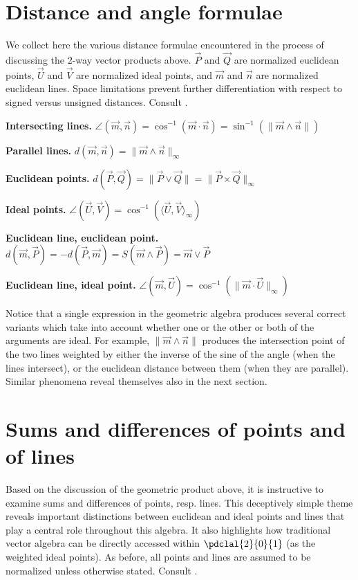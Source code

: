 \documentclass[12pt]{article}
\begin{document}
\section{Distance and angle formulae}
\label{sec:daf}
We collect here the various distance formulae  encountered in the process of discussing the 2-way vector products above.  $\vec{P}$ and $\vec{Q}$ are normalized euclidean points, $\vec{U}$ and $\vec{V}$ are normalized ideal points, and $\vec{m}$ and $\vec{n}$ are normalized euclidean lines.  Space limitations prevent further differentiation with respect to signed versus unsigned distances. Consult .
\begin{compactenum}
\item \textbf{Intersecting lines.} $\angle(\vec{m},\vec{n}) = \cos^{-1}{(\vec{m} \cdot \vec{n})} = \sin^{-1}{(\| \vec{m} \wedge \vec{n} \|)}$
\item \textbf{Parallel lines.} $d(\vec{m}, \vec{n}) = \|\vec{m} \wedge \vec{n}\|_\infty$
\item \textbf{Euclidean points.} $d(\vec{P},\vec{Q}) = \|\vec{P} \vee \vec{Q} \| = \| \vec{P} \times \vec{Q} \|_\infty$
\item \textbf{Ideal points.} $\angle(\vec{U}, \vec{V}) = \cos^{-1}(\langle \vec{U}, \vec{V} \rangle_{\infty})$
\item \textbf{Euclidean line, euclidean point.} $d(\vec{m}, \vec{P})  = -d(\vec{P}, \vec{m}) = S(\vec{m} \wedge \vec{P}) = \vec{m} \vee \vec{P} $
\item \textbf{Euclidean line, ideal point.} $\angle(\vec{m}, \vec{U}) = \cos^{-1}{(\| \vec{m} \cdot \vec{U} \|_{\infty})}$
\end{compactenum}
Notice that  a single expression in the geometric algebra produces several correct variants which take into account whether one or the other or both of the arguments are ideal.  For example, $ \|\vec{m} \wedge \vec{n}\|$ produces the intersection point of the two lines weighted by either the inverse of the sine of the angle (when the lines intersect), or the euclidean distance between them (when they are parallel).  Similar phenomena reveal themselves also in the next section.
\vspace{-.1in}
 
 \section{Sums and differences of points and of lines}
 \label{sec:sumdiff}
 Based on the discussion of the geometric product above,
it is instructive to examine sums and differences of points, resp. lines.  This deceptively simple theme reveals important distinctions between euclidean and ideal points and lines that play a central role throughout this algebra. It also highlights how traditional vector algebra can be directly accessed within $\pdclal{2}{0}{1}$ (as the weighted ideal points).   As before, all points and lines are assumed to be normalized unless otherwise stated. Consult .
 
\end{document}
